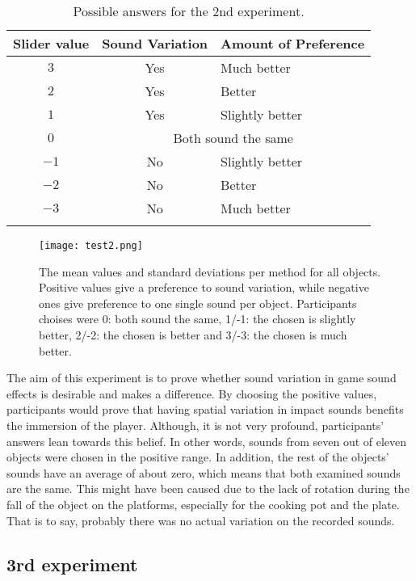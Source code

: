 \begin{table}[H]
	\centering
    \begin{tabular}{  c  c  l  }
    \toprule
    \textbf{Slider value} & \textbf{Sound Variation} & \textbf{Amount of Preference} \\ \toprule
    \addlinespace
    $3$ & Yes & Much better \\ 
    $2$ & Yes & Better \\ 
    $1$ & Yes & Slightly better \\ 
    \addlinespace
    $0$ & \multicolumn{2}{c}{Both sound the same} \\ 
    \addlinespace
    $-1$ & No & Slightly better \\ 
    $-2$ & No & Better \\ 
    $-3$ & No & Much better \\
    \addlinespace
    \bottomrule
    \end{tabular}
    \caption{Possible answers for the 2nd experiment.}
    \label{tab:test2_ans}
\end{table}

\begin{figure}[H]
  \centering
    \texttt{[image: test2.png]}
      \caption{The mean values and standard deviations per method for all objects. Positive values give a preference to sound variation, while negative ones give preference to one single sound per object. Participants choises were 0: both sound the same, 1/-1: the chosen is slightly better, 2/-2: the chosen is better and 3/-3: the chosen is much better.}\label{fig:test2}
\end{figure}

The aim of this experiment is to prove whether sound variation in game sound effects is desirable and makes a difference. By choosing the positive values, participants would prove that having spatial variation in impact sounds benefits the immersion of the player. Although, it is not very profound, participants' answers lean towards this belief. In other words, sounds from seven out of eleven objects were chosen in the positive range. In addition, the rest of the objects' sounds have an average of about zero, which means that both examined sounds are the same. This might have been caused due to the lack of rotation during the fall of the object on the platforms, especially for the cooking pot and the plate. That is to say, probably there was no actual variation on the recorded sounds.

\subsection{3rd experiment}

